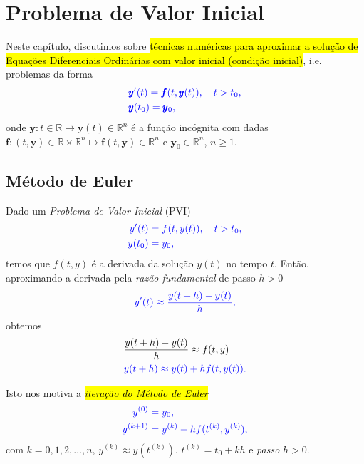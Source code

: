 

\chapter{Problema de Valor Inicial}\label{cap_pvi}
\thispagestyle{fancy}

Neste capítulo, discutimos sobre \hl{técnicas numéricas para aproximar a solução de Equações Diferenciais Ordinárias com valor inicial (condição inicial)}, i.e. problemas da forma
\begin{subequations}\hleq
  \begin{align}
    &\pmb{y}'(t) = \pmb{f}(t,\pmb{y}(t)),\quad t>t_0,\\
    &\pmb{y}(t_0) = \pmb{y}_0,
  \end{align}
\end{subequations}
onde $\pmb{y}:t\in\mathbb{R}\mapsto\pmb{y}(t)\in\mathbb{R}^n$ é a função incógnita com dadas $\pmb{f}:(t,\pmb{y})\in\mathbb{R}\times\mathbb{R}^n\mapsto\pmb{f}(t,\pmb{y})\in\mathbb{R}^n$ e $\pmb{y}_0\in\mathbb{R}^n$, $n\geq 1$.

\section{Método de Euler}\label{cap_pvi_sec_euler}

Dado um \emph{Problema de Valor Inicial} (PVI)
\begin{subequations}\label{cap_pvi_sec_euler:eq:pvi}\hleq
  \begin{align}
    y'(t) &= f(t,y(t)),\quad t>t_0,\\
    y(t_0) &= y_0,
  \end{align}
\end{subequations}
temos que $f(t,y)$ é a derivada da solução $y(t)$ no tempo $t$. Então, aproximando a derivada pela \emph{razão fundamental} de passo $h>0$
\begin{equation}\color{blue}y'(t) \approx \frac{y(t+h)-y(t)}{h},
\end{equation}
obtemos
\begin{align}
  &\frac{y(t+h)-y(t)}{h} \approx f(t,y) \\
  &\color{blue}y(t+h) \approx y(t) + hf(t,y(t)).\label{cap_pvi_sec_euler:eq:euler_aux1}
\end{align}

Isto nos motiva a \hl{\emph{iteração do Método de Euler}}{\euler}
\begin{subequations}\hleq
  \begin{align}
    y^{(0)} &= y_0,\\
    y^{(k+1)} &= y^{(k)} + hf(t^{(k)},y^{(k)}),
  \end{align}
\end{subequations}
com $k=0, 1, 2, \dotsc, n$, $y^{(k)}\approx y\left(t^{(k)}\right)$, $t^{(k)} = t_0 + kh$ e \emph{passo} $h>0$.

